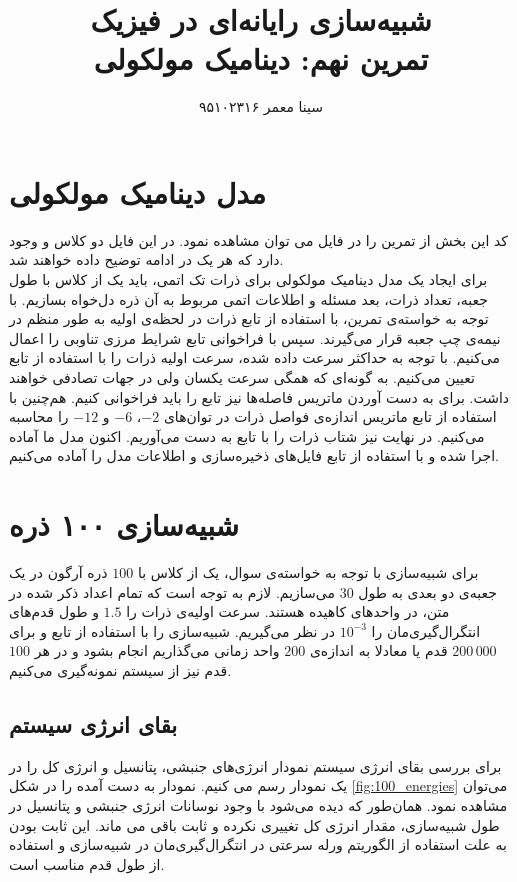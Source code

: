 \documentclass[11pt, a4paper]{article}
\title{\textbf{شبیه‌سازی رایانه‌ای در فیزیک}\\تمرین نهم: دینامیک مولکولی}
\author{سینا معمر ۹۵۱۰۲۳۱۶}
\begin{document}
\maketitle
\thispagestyle{empty}


\section{\textbf{مدل دینامیک مولکولی}}
کد این بخش از تمرین را در فایل
می توان مشاهده نمود.
در این فایل دو کلاس
و
وجود دارد که هر یک در ادامه توضیح داده خواهند شد.
\\
برای ایجاد یک مدل دینامیک مولکولی برای ذرات تک اتمی،
باید یک
از کلاس
با طول جعبه، تعداد ذرات، بعد مسئله و اطلاعات اتمی مربوط به آن ‌ذره دل‌خواه بسازیم.
با توجه به خواسته‌ی تمرین، با استفاده از تابع
ذرات در لحظه‌ی اولیه به طور منظم در نیمه‌ی چپ جعبه قرار می‌گیرند.
سپس با فراخوانی تابع
شرایط مرزی تناوبی را اعمال می‌کنیم.
با توجه به حداکثر سرعت داده شده، سرعت اولیه ذرات را با استفاده از تابع
تعیین می‌کنیم.
به گونه‌ای که همگی سرعت یکسان ولی در جهات تصادفی خواهند داشت.
برای به دست آوردن ماتریس فاصله‌ها نیز تابع
را باید فراخوانی کنیم.
هم‌چنین با استفاده از تابع
ماتریس اندازه‌ی فواصل ذرات در توان‌های
$-2$،
$-6$
و
$-12$
را محاسبه می‌کنیم.
در نهایت نیز شتاب ذرات را با تابع
به دست می‌آوریم.
اکنون مدل ما آماده اجرا شده و با استفاده از تابع
فایل‌های ذخیره‌سازی و اطلاعات مدل را آماده می‌کنیم.


\section{\textbf{شبیه‌سازی ۱۰۰ ذره}}
برای شبیه‌سازی با توجه به خواسته‌ی سوال، یک
از کلاس
با
$100$
ذره آرگون در یک جعبه‌ی دو بعدی به طول
$30$
می‌سازیم.
لازم به توجه است که تمام اعداد ذکر شده در متن، در واحد‌های کاهیده هستند.
سرعت اولیه‌ی ذرات را
$1.5$
و طول قدم‌های انتگرال‌گیری‌مان را
$10^{-3}$
در نظر می‌گیریم.
شبیه‌سازی را با استفاده از تابع
و برای
$200\,000$
قدم یا معادلا به اندازه‌ی
$200$
واحد زمانی می‌گذاریم انجام بشود و در هر
$100$
قدم نیز از سیستم نمونه‌گیری می‌کنیم.


\subsection{بقای انرژی سیستم}
برای بررسی بقای انرژی سیستم نمودار انرژی‌های جنبشی، پتانسیل و انرژی کل را در یک نمودار رسم می کنیم.
نمودار به دست آمده را در شکل
\ref{fig:100_energies}
می‌توان مشاهده نمود.
همان‌طور که دیده می‌شود با وجود نوسانات انرژی جنبشی و پتانسیل در طول شبیه‌سازی،
مقدار انرژی کل تغییری نکرده و ثابت باقی می ماند.
این ثابت بودن به علت استفاده از الگوریتم ورله سرعتی در انتگرال‌گیری‌‌مان در شبیه‌سازی و استفاده از طول قدم مناسب است.
\end{document}
